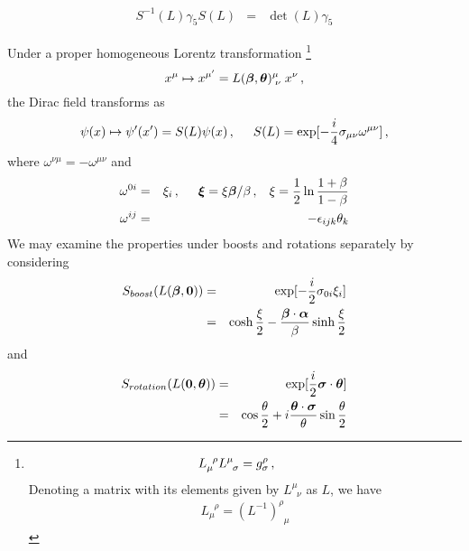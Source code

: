 \begin{eqnarray}
S^{-1}(L) \gamma_5 S(L)
&=&
\det(L) \gamma_5
\end{eqnarray}
\bigskip

\bigskip

Under a proper homogeneous Lorentz transformation
\footnote{%
\begin{eqnarray*}
L_\mu^{\;\;\rho} L^\mu_{\;\;\sigma} = g^\rho_\sigma\,,
\hspace{5mm}
\end{eqnarray*}
Denoting a matrix with its elements given by $L^\mu_{\;\;\nu}$ as $L$,
we have
\begin{eqnarray*}
L_\mu^{\;\;\rho} = (L^{-1})^\rho_{\;\;\mu}
\end{eqnarray*}
}%
\begin{equation}
x^\mu \mapsto x^{\mu'} = L(\mbox{\boldmath $\beta$}, \mbox{\boldmath $\theta$})^\mu_{\;\nu}\; x^\nu\,,
\end{equation}
the Dirac field transforms as
\begin{eqnarray}
\psi(x) \mapsto \psi'(x') = S(L) \psi(x)\,,
\hspace{5mm}
S(L) = \exp[ -\frac{i}{4}\sigma_{\mu \nu} \omega^{\mu \nu}]\,,
\end{eqnarray}
where $\omega^{\nu \mu} = -\omega^{\mu \nu}$ and
\begin{eqnarray}
\omega^{0i} &=& \xi_i\,,
\hspace{5mm}
\mbox{\boldmath $\xi$} = \xi \mbox{\boldmath $\beta$}/\beta\,,
\hspace{3mm}
\xi = \frac{1}{2} \ln \frac{1+\beta}{1-\beta}
\\
\omega^{ij}
&=&
-\epsilon_{ijk} \theta_k
\end{eqnarray}
We may examine the properties under boosts and rotations separately by considering
\begin{eqnarray}
S_{boost}(L(\mbox{\boldmath $\beta$},\mbox{\boldmath $0$})) &=& \exp[
-\frac{i}{2}\sigma_{0i}\xi_i ]
\\
&=&
\cosh \frac{\xi}{2} - \frac{\mbox{\boldmath $\beta$}\cdot \mbox{\boldmath $\alpha$}}{\beta} \sinh \frac{\xi}{2}
\end{eqnarray}
and
\begin{eqnarray}
S_{rotation}(L(\mbox{\boldmath $0$},\mbox{\boldmath $\theta$}))&=& \exp[
\frac{i}{2} \mbox{\boldmath $\sigma$}\cdot \mbox{\boldmath $\theta$} ]
\\
&=&
\cos \frac{\theta}{2}
+ i \frac{\mbox{\boldmath $\theta$}\cdot\mbox{\boldmath $\sigma$}}{\theta} \sin \frac{\theta}{2}
\end{eqnarray}

